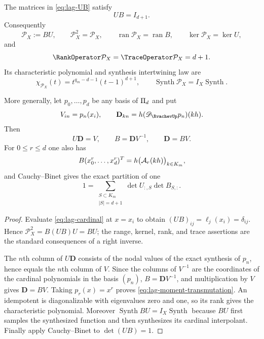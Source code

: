 \begin{theorem}
\label{thm:lag-right-inverse}
The matrices in \eqref{eq:lag-UB} satisfy
\begin{equation}
 \boxed{UB=I_{d+1}.}
 \label{eq:lag-UB-I}
\end{equation}
Consequently
\begin{equation}
 \mathcal P_X:=BU,\qquad
 \mathcal P_X^2=\mathcal P_X,\qquad
 \operatorname{ran}\mathcal P_X=\operatorname{ran}B,\qquad
 \ker\mathcal P_X=\ker U,
 \label{eq:lag-projector}
\end{equation}
and
\[
 \RankOperator\mathcal P_X=\TraceOperator\mathcal P_X=d+1.
\]
Its characteristic polynomial and synthesis intertwining law are
\begin{equation}
 \chi_{\mathcal P_X}(t)=t^{q_m-d-1}(t-1)^{d+1},
 \qquad
 \operatorname{Synth}\mathcal P_X=I_X\operatorname{Synth}.
 \label{eq:lag-projector-extra}
\end{equation}

More generally, let $p_0,\ldots,p_d$ be any basis of $\Pi_d$ and put
\begin{equation}
 V_{in}=p_n(x_i),
 \qquad
 \mathbf D_{kn}=h(\mathscr D_{\RvachevUp}p_n)(kh).
 \label{eq:lag-UVD}
\end{equation}
Then
\begin{equation}
 \boxed{U\mathbf D=V,\qquad B=\mathbf D V^{-1},\qquad
 \mathbf D=BV.}
 \label{eq:lag-basis-factorization}
\end{equation}
For $0\le r\le d$ one also has
\begin{equation}
 B(x_0^r,\ldots,x_d^r)^T
 =h\bigl(\mathcal A_r(kh)\bigr)_{k\in K_m},
 \label{eq:lag-moment-transmutation}
\end{equation}
and Cauchy--Binet gives the exact partition of one
\begin{equation}
 1=\sum_{\substack{S\subset K_m\\|S|=d+1}}
 \det U_{:,S}\det B_{S,:}.
 \label{eq:lag-cauchy-binet}
\end{equation}
\end{theorem}

\begin{proof}
Evaluate \eqref{eq:lag-cardinal} at $x=x_i$ to obtain
$(UB)_{ij}=\ell_j(x_i)=\delta_{ij}$.  Hence
$\mathcal P_X^2=B(UB)U=BU$; the range, kernel, rank, and trace assertions are
the standard consequences of a right inverse.

The $n$th column of $U\mathbf D$ consists of the nodal values of the exact synthesis
of $p_n$, hence equals the $n$th column of $V$.  Since the columns of
$V^{-1}$ are the coordinates of the cardinal polynomials in the basis
$(p_n)$, $B=\mathbf D V^{-1}$, and multiplication by $V$ gives
$\mathbf D=BV$.
Taking $p_r(x)=x^r$ proves \eqref{eq:lag-moment-transmutation}.  An
idempotent is diagonalizable with eigenvalues zero and one, so its rank gives
the characteristic polynomial.  Moreover
$\operatorname{Synth}BU=I_X\operatorname{Synth}$ because $BU$ first samples
the synthesized function and then synthesizes its cardinal interpolant.
Finally apply Cauchy--Binet to $\det(UB)=1$.
\end{proof}

